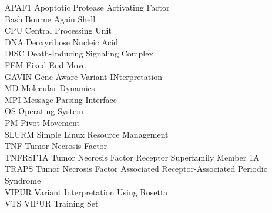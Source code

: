 APAF1 Apoptotic Protease Activating Factor\\
Bash Bourne Again Shell\\
CPU Central Processing Unit\\
DNA Deoxyribose Nucleic Acid\\
DISC Death-Inducing Signaling Complex\\
FEM Fixed End Move\\
GAVIN Gene-Aware Variant INterpretation\\
MD	Molecular Dynamics\\
MPI Message Parsing Interface\\
OS Operating System\\
PM Pivot Movement\\
SLURM Simple Linux Resource Management\\
TNF Tumor Necrosis Factor\\
TNFRSF1A Tumor Necrosis Factor Receptor Superfamily Member 1A\\
TRAPS Tumor Necrosis Factor Associated Receptor-Associated Periodic Syndrome\\
VIPUR Variant Interpretation Using Rosetta\\
VTS VIPUR Training Set\\